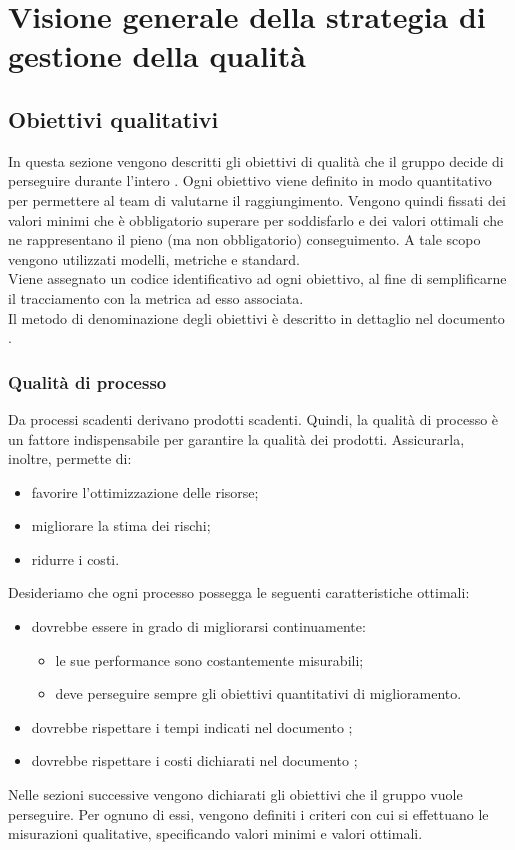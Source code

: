 \documentclass[PianoDiQualifica.tex]{subfiles}
\begin{document}
\section{Visione generale della strategia di gestione della qualità}
	\subsection{Obiettivi qualitativi}
		In questa sezione vengono descritti gli obiettivi di qualità che il gruppo \GRUPPO{} decide di perseguire durante l'intero .
		Ogni obiettivo viene definito in modo quantitativo per permettere al team di valutarne il raggiungimento.
		Vengono quindi fissati dei valori minimi che è obbligatorio superare per soddisfarlo e dei valori ottimali che ne rappresentano il pieno (ma non obbligatorio) conseguimento.
		A tale scopo vengono utilizzati modelli, metriche e standard. \\
		Viene assegnato un codice identificativo ad ogni obiettivo, al fine di semplificarne il tracciamento con la metrica ad esso associata. \\
		Il metodo di denominazione degli obiettivi è descritto in dettaglio nel documento \NPdocRR{}.

		\subsubsection{Qualità di processo}
		Da processi scadenti derivano prodotti scadenti. Quindi, la qualità di processo è un fattore indispensabile per garantire la qualità dei prodotti. Assicurarla, inoltre, permette di:
		\begin{itemize}
			\item favorire l'ottimizzazione delle risorse;
			\item migliorare la stima dei rischi;
			\item ridurre i costi.
		\end{itemize}
		Desideriamo che ogni processo possegga le seguenti caratteristiche ottimali:
		\begin{itemize}
			\item dovrebbe essere in grado di migliorarsi continuamente:
			\begin{itemize}
					\item le sue performance sono costantemente misurabili;
					\item deve perseguire sempre gli obiettivi quantitativi di miglioramento.
			\end{itemize}
			\item dovrebbe rispettare i tempi indicati nel documento \PPdocRR;
			\item dovrebbe rispettare i costi dichiarati nel documento \PPdocRR;
		\end{itemize}
		Nelle sezioni successive vengono dichiarati gli obiettivi che il gruppo vuole perseguire. Per ognuno di essi, vengono definiti i criteri con cui si effettuano le misurazioni qualitative,
		specificando valori minimi e valori ottimali.
\end{document}
